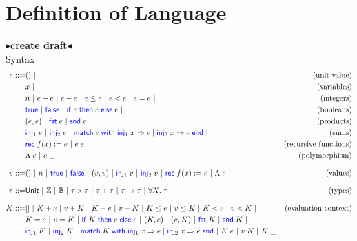 \documentclass[twoside,11pt,openright]{report}
\theoremstyle{definition}
\newcommand{\BNFdef}{::=}
\newcommand{\ALT}{~|~}
\newcommand{\Keyword}[1]{{\color{blue} \mathsf{#1}}}
\newcommand{\var}{x}
\newcommand{\expr}{e}
\newcommand{\val}{v}
\newcommand{\TT}{()}
\newcommand{\Num}[1]{\overline{#1}}
\newcommand{\True}{\Keyword{true}}
\newcommand{\False}{\Keyword{false}}
\newcommand{\IfCmd}{\Keyword{if}}
\newcommand{\ThenCmd}{\Keyword{then}}
\newcommand{\ElseCmd}{\Keyword{else}}
\def\If#1then#2else#3{\IfCmd{}\;#1\;\ThenCmd{}\;#2\;\ElseCmd{}\;#3}
\newcommand{\Fst}{\Keyword{fst}\;}
\newcommand{\Snd}{\Keyword{snd}\;}
\newcommand{\Inj}[1]{\Keyword{inj}_{#1}\;}
\newcommand{\MatchCmd}{\Keyword{match}}
\newcommand{\WithCmd}{\Keyword{with}}
\newcommand{\EndCmd}{\Keyword{end}}
\def\Match#1with#2=>#3|#4=>#5end{\MatchCmd{}\;#1\;\WithCmd{}\;#2\Rightarrow#3 \;|\;#4\Rightarrow#5\;\EndCmd{}}
\newcommand{\Tvar}{X}
\newcommand{\Tlam}{\Lambda\;}
\newcommand{\Tapp}[1]{#1\;\_}
\newcommand{\empelctx}{[]}
\newcommand{\elctx}{K}
\newcommand{\Tunit}{\mathsf{Unit}}
\newcommand{\Tint}{\mathbb{Z}}
\newcommand{\Tbool}{\mathbb{B}}
\newcommand{\Tprod}[2]{#1 \times #2}
\newcommand{\Tsum}[2]{#1 + #2}
\newcommand{\Tfunc}[2]{#1 \rightarrow #2}
\newcommand{\Tall}[2]{\forall #1.\; #2}
\newcommand{\typ}{\tau}
\newcommand{\todo}[1]{{\color[rgb]{.5,0,0}\textbf{$\blacktriangleright$#1$\blacktriangleleft$}}}
\begin{document}
\chapter{Definition of Language}
\label{ch:DoL}

\todo{create draft}\\
Syntax
\begin{align*}
  \expr \BNFdef & \TT \ALT & \text{(unit value)}\\
                & \var \ALT & \text{(variables)}\\
                & \Num{n} \ALT \expr + \expr \ALT \expr - \expr \ALT
                  \expr \le \expr \ALT \expr < \expr \ALT 
                  \expr = \expr \ALT & \text{(integers)}\\
                & \True \ALT \False \ALT {\If \expr then \expr else \expr} \ALT
                  & \text{(booleans)}\\
                & (\expr, \expr) \ALT \Fst \expr \ALT \Snd \expr \ALT
                  & \text{(products)}\\
                & \Inj{1} \expr \ALT \Inj{2} \expr \ALT 
                  \Match \expr with \Inj{1} \var => \expr | \Inj{2} \var => \expr end \ALT
                  & \text{(sums)}\\
                & \Rec f \var := \expr \ALT \expr \; \expr
                  & \text{(recursive functions)}\\
                & \Tlam \expr \ALT \Tapp{\expr} & \text{(polymorphism)}\\[8pt]
  \val \BNFdef  & \TT \ALT \Num{n} \ALT \True \ALT \False \ALT
                  (\val, \val) \ALT \Inj{1} \val \ALT \Inj{2} \val \ALT
                  \Rec f \var := \expr \ALT \Tlam \expr
                  & \text{(values)}\\[8pt]
  \typ \BNFdef  & \Tunit \ALT \Tint \ALT \Tbool \ALT {\Tprod \typ \typ} \ALT
                  {\Tsum \typ \typ} \ALT {\Tfunc \typ \typ} \ALT 
                  {\Tall \Tvar \typ} & \text{(types)}\\[8pt]
  \elctx \BNFdef& \empelctx \ALT 
                  \elctx + \expr \ALT \val + \elctx \ALT
                  \elctx - \expr \ALT \val - \elctx \ALT
                  \elctx \le \expr \ALT \val \le \elctx \ALT
                  \elctx < \expr \ALT \val < \elctx \ALT 
                  & \text{(evaluation context)}\\
                & \elctx = \expr \ALT \val = \elctx \ALT
                  {\If \elctx then \expr else \expr} \ALT
                  (\elctx, \expr) \ALT (\val, \elctx) \ALT
                  \Fst \elctx \ALT \Snd \elctx \ALT\\
                & \Inj{1} \elctx \ALT \Inj{2} \elctx \ALT
                  \Match \elctx with \Inj{1} \var => \expr | \Inj{2} \var => \expr end \ALT
                  \elctx \; \expr \ALT \val \; \elctx \ALT \Tapp{\elctx}
\end{align*}
\end{document}
